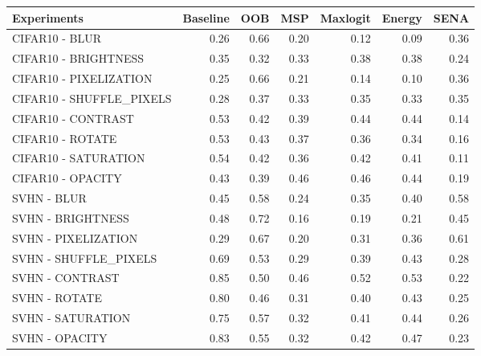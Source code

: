 \begin{tabular}{lrrrrrr}
\toprule
             Experiments &  Baseline &  OOB &  MSP &  Maxlogit &  Energy &  SENA \\
\midrule
          CIFAR10 - BLUR &      0.26 & 0.66 & 0.20 &      0.12 &    0.09 &  0.36 \\
    CIFAR10 - BRIGHTNESS &      0.35 & 0.32 & 0.33 &      0.38 &    0.38 &  0.24 \\
  CIFAR10 - PIXELIZATION &      0.25 & 0.66 & 0.21 &      0.14 &    0.10 &  0.36 \\
CIFAR10 - SHUFFLE\_PIXELS &      0.28 & 0.37 & 0.33 &      0.35 &    0.33 &  0.35 \\
      CIFAR10 - CONTRAST &      0.53 & 0.42 & 0.39 &      0.44 &    0.44 &  0.14 \\
        CIFAR10 - ROTATE &      0.53 & 0.43 & 0.37 &      0.36 &    0.34 &  0.16 \\
    CIFAR10 - SATURATION &      0.54 & 0.42 & 0.36 &      0.42 &    0.41 &  0.11 \\
       CIFAR10 - OPACITY &      0.43 & 0.39 & 0.46 &      0.46 &    0.44 &  0.19 \\
             SVHN - BLUR &      0.45 & 0.58 & 0.24 &      0.35 &    0.40 &  0.58 \\
       SVHN - BRIGHTNESS &      0.48 & 0.72 & 0.16 &      0.19 &    0.21 &  0.45 \\
     SVHN - PIXELIZATION &      0.29 & 0.67 & 0.20 &      0.31 &    0.36 &  0.61 \\
   SVHN - SHUFFLE\_PIXELS &      0.69 & 0.53 & 0.29 &      0.39 &    0.43 &  0.28 \\
         SVHN - CONTRAST &      0.85 & 0.50 & 0.46 &      0.52 &    0.53 &  0.22 \\
           SVHN - ROTATE &      0.80 & 0.46 & 0.31 &      0.40 &    0.43 &  0.25 \\
       SVHN - SATURATION &      0.75 & 0.57 & 0.32 &      0.41 &    0.44 &  0.26 \\
          SVHN - OPACITY &      0.83 & 0.55 & 0.32 &      0.42 &    0.47 &  0.23 \\
\bottomrule
\end{tabular}
